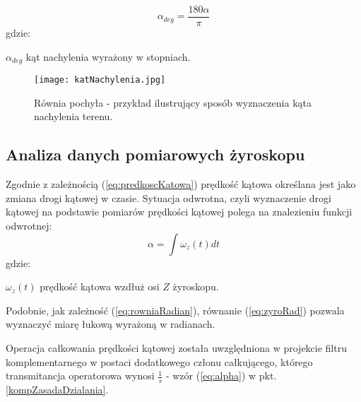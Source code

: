\begin{equation}
    \alpha_{deg}=\frac{180\alpha}{\pi}
    \label{eq:rowniaStopnie}
\end{equation}
gdzie:
\begin{eqwhere}[2cm]
	\item[$\alpha_{deg}$] kąt nachylenia wyrażony w stopniach.
\end{eqwhere}
\begin{figure}[h]
    \centering
    \texttt{[image: katNachylenia.jpg]}
    \caption{Równia pochyła - przykład ilustrujący sposób wyznaczenia kąta nachylenia terenu.}
    \label{fig:rownia}
\end{figure}
\subsection{Analiza danych pomiarowych żyroskopu}
\label{gyro}
Zgodnie z zależnością (\ref{eq:predkoscKatowa}) prędkość kątowa określana jest jako zmiana drogi kątowej w czasie. Sytuacja odwrotna, czyli wyznaczenie drogi kątowej na podstawie pomiarów prędkości kątowej polega na znalezieniu funkcji odwrotnej:
\begin{equation}  
    \alpha = \int{\omega_{z}(t)dt}
    \label{eq:zyroRad}
\end{equation}
gdzie:
\begin{eqwhere}[2cm]
	\item[$\omega_{z}(t)$] prędkość kątowa wzdłuż osi $Z$ żyroskopu.
	
\end{eqwhere}

Podobnie, jak zależność (\ref{eq:rowniaRadian}), równanie (\ref{eq:zyroRad}) pozwala wyznaczyć miarę łukową wyrażoną w radianach.

Operacja całkowania prędkości kątowej została uwzględniona w projekcie filtru komplementarnego w postaci dodatkowego członu całkującego, którego transmitancja operatorowa wynosi $\frac{1}{s}$ - wzór (\ref{eq:alpha}) w pkt. \ref{kompZasadaDzialania}.

